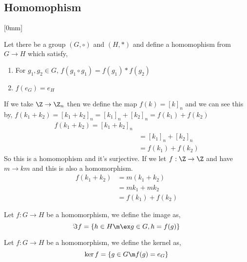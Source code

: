 
\subsection{Homomophism}[0mm]

\begin{ndefi}[Homomophism]
  Let there be a group $(G, \circ)$ and $(H, *)$ and define a homomophism from $G \to H$ which satisfy,
  \begin{enumerate}
    \item For $g_1, g_2 \in G$, $f(g_1 \circ g_1) = f(g_1) * f(g_2)$
    \item $f(e_G) = e_H$
  \end{enumerate}
\end{ndefi}

If we take $\Z \to \Z_n$ then we define the map $f(k) = [k]_n$ and we can see this by, $f(k_1 + k_2) = [k_1 + k_2]_n = [k_1]_n + [k_2]_n = f(k_1) + f(k_2)$
\begin{align*}
  f(k_1 + k_2) = [k_1 + k_2]_n\\
  &= [k_1]_n + [k_2]_n\\
  &= f(k_1) + f(k_2)
\end{align*}
So this is a homomophism and it's surjective. If we let $f: \Z \to \Z$ and have $m \to km$ and this is also a homomorphism.
\begin{align*}
  f(k_1 + k_2) &= m(k_1 + k_2)\\
  &= mk_1 + mk_2\\
  &= f(k_1) + f(k_2)
\end{align*}

\begin{ndefi}[Image]
  Let $f : G \to H$ be a homomorphism, we define the image as,
  $$ \Im f = \{ h \in H \m \ex g \in G, h = f(g)\} $$
\end{ndefi}

\begin{ndefi}[Kernel]
  Let $f : G \to H$ be a homomorphism, we define the kernel as,
  $$ \ker f = \{ g \in G \m f(g) = e_G \} $$
\end{ndefi}

